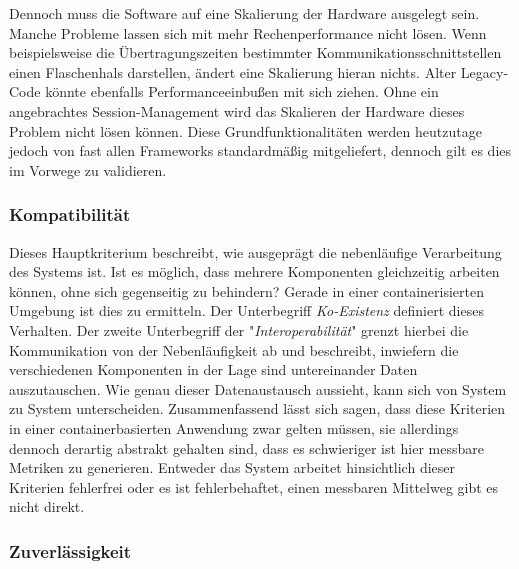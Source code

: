 Dennoch muss die Software auf eine Skalierung der Hardware ausgelegt sein. Manche Probleme lassen sich mit mehr Rechenperformance nicht lösen. Wenn beispielsweise die Übertragungszeiten bestimmter Kommunikationsschnittstellen einen Flaschenhals darstellen, ändert eine Skalierung hieran nichts. Alter Legacy-Code könnte ebenfalls Performanceeinbußen mit sich ziehen. Ohne ein angebrachtes Session-Management wird das Skalieren der Hardware dieses Problem nicht lösen können. Diese Grundfunktionalitäten werden heutzutage jedoch von fast allen Frameworks standardmäßig mitgeliefert, dennoch gilt es dies im Vorwege zu validieren. 


\subsubsection{Kompatibilität}
\label{ss:kompatabilitaet}
Dieses Hauptkriterium beschreibt, wie ausgeprägt die nebenläufige Verarbeitung des Systems ist. Ist es möglich, dass mehrere Komponenten gleichzeitig arbeiten können, ohne sich gegenseitig zu behindern? Gerade in einer containerisierten Umgebung ist dies zu ermitteln. Der Unterbegriff \emph{Ko-Existenz} definiert dieses Verhalten. Der zweite Unterbegriff der "\emph{Interoperabilität}" grenzt hierbei die Kommunikation von der Nebenläufigkeit ab und beschreibt, inwiefern die verschiedenen Komponenten in der Lage sind untereinander Daten auszutauschen. Wie genau dieser Datenaustausch aussieht, kann sich von System zu System unterscheiden. Zusammenfassend lässt sich sagen, dass diese Kriterien in einer containerbasierten Anwendung zwar gelten müssen, sie allerdings dennoch derartig abstrakt gehalten sind, dass es schwieriger ist hier messbare Metriken zu generieren. Entweder das System arbeitet hinsichtlich dieser Kriterien fehlerfrei oder es ist fehlerbehaftet, einen messbaren Mittelweg gibt es nicht direkt.


\subsubsection{Zuverlässigkeit}
\label{ss:zuverlaessigkeit}



